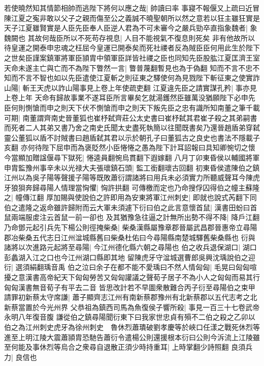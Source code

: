 若使曉然知其情節相帥而逃陛下將何以應之哉|{
	帥讀曰率}
事寢不報偃又上疏曰近冒陳江夏之寃非敢以父子之親而傷至公之義誠不曉聖朝所以然之意若以狂主雖狂實是天子江夏雖賢實是人臣先臣奉人臣逆人君為不可未審今之嚴兵勁卒直指象魏者|{
	象魏闕也}
其故何哉臣所以不死苟存視息|{
	人目不能視氣不復息則死矣}
非有他故所以待皇運之開泰申忠魂之枉屈今皇運已開泰矣而死社禝者反為賊臣臣何用此生於陛下之世矣臣謹案鎮軍將軍臣頴胄中領軍臣詳皆社禝之臣也同知先臣股肱江夏匡濟王室天命未遂主亡與亡而不為陛下瞥然一言|{
	瞥普蔑翻暫見也為于偽翻}
知而不言不忠不知而不言不智也如以先臣遣使江夏斬之則征東之驛使何為見戮陛下斬征東之使實詐山陽|{
	斬王天虎以詐山陽事見上卷上年使疏吏翻}
江夏違先臣之請實謀孔矜|{
	事亦見上卷上年}
天命有歸故事業不遂耳臣所言畢矣乞就湯鑊然臣雖萬没猶願陛下必申先臣何則惻愴而申之則天下伏不惻愴而申之則天下叛先臣之忠有識所知南董之筆千載可期|{
	南董謂齊南史晉董狐也崔杼弑齊莊公太史書曰崔杼弑其君崔子殺之其弟嗣書而死者二人其弟又書乃舍之南史氏聞太史盡死執簡以往聞既書矣乃還晉趙盾弟穿弑靈公董狐以盾不討賊書曰趙盾弑其君以示於朝孔子曰董狐古之良史也書法不隱載子亥翻}
亦何待陛下屈申而為褒貶然小臣惓惓之愚為陛下計耳詔報曰具知卿惋切之懷今當顯加贈諡偃尋下獄死|{
	惓逵員翻惋烏貫翻下遐嫁翻}
八月丁卯東昏侯以輔國將軍申胄監豫州事辛未以光禄大夫張瓌鎮石頭|{
	監工銜翻瓌古回翻}
初東昏侯遣陳伯之鎮江州以為吳子陽等聲援子陽等既敗蕭衍謂諸將曰用兵未必須實力所聽威聲耳今陳虎牙狼狽奔歸尋陽人情理當恟懼|{
	恟許拱翻}
可傳檄而定也乃命搜俘囚得伯之幢主蘇隆之|{
	幢傳江翻}
厚加賜與使說伯之許即用為安東將軍江州刺史|{
	即就也說式芮翻下同}
伯之遣隆之返命雖許歸附而云大軍未須遽下衍曰伯之此言意懷首鼠|{
	漢書田蚡曰首鼠兩端服䖍注云首鼠一前一卻也}
及其猶豫急往逼之計無所出勢不得不降|{
	降戶江翻}
乃命鄧元起引兵先下楊公則徑掩柴桑|{
	柴桑漢縣屬豫章郡晉屬武昌郡晉惠帝立尋陽郡冶柴桑五代志日江州湓城縣舊曰柴桑杜佑曰今尋陽縣南楚城驛舊柴桑縣也}
衍與諸將以次進路元起將至尋陽|{
	今江州德化縣六朝之尋陽也}
伯之收兵退保湖口|{
	湖口彭蠡湖入江之口也今江州湖口縣即其地}
留陳虎牙守湓城選曹郎吳興沈瑀說伯之迎衍|{
	選須絹翻瑀音禹}
伯之泣曰余子在都不能不愛瑀曰不然人情匈匈|{
	毛晃曰匈匈喧擾之意漢書高帝紀天下匈匈勞苦又匈匈讙議之聲荀子居子不為小人之匈匈而易其行匈匈漢書無音荀子有平去二音}
皆思改計若不早圖衆散難合丙子衍至尋陽伯之束甲請罪初新蔡太守席謙|{
	蕭子顯齊志江州有南新蔡郡豫州有北新蔡郡以五代志考之北新蔡當置於今光州界}
父恭祖為鎮西司馬為魚復侯子響所殺|{
	事見一百三十七卷武帝永明八年復音腹}
謙從伯之鎮尋陽聞衍東下曰我家世忠貞有殞不二伯之殺之乙卯以伯之為江州刺史虎牙為徐州刺史　魯休烈蕭璝破劉孝慶等於峽口任漾之戰死休烈等進至上明江陵大震蕭頴胄恐馳告蕭衍令遣楊公則還援根本衍曰公則今泝流上江陵雖至何能及事休烈等烏合之衆尋自退散正須少時持重耳|{
	上時掌翻少詩照翻}
良須兵力|{
	良信也}
